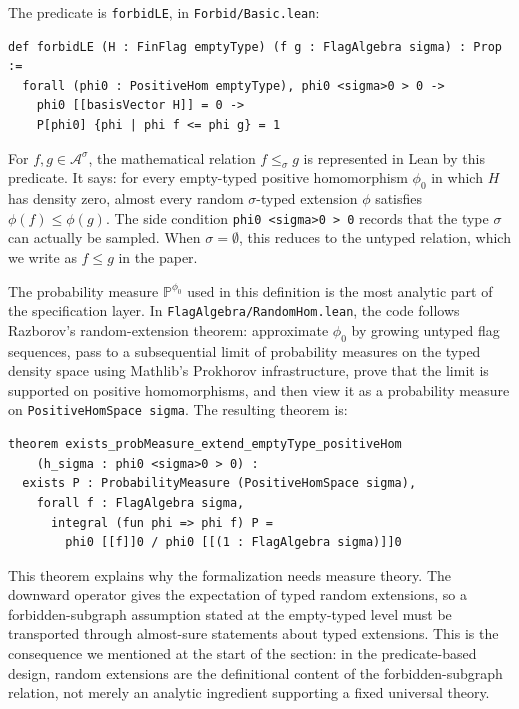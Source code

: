 \documentclass{article}
\newcommand{\lean}[1]{\texttt{#1}}
\begin{document}
The predicate is \lean{forbidLE}, in \lean{Forbid/Basic.lean}:
\begin{lstlisting}
def forbidLE (H : FinFlag emptyType) (f g : FlagAlgebra sigma) : Prop :=
  forall (phi0 : PositiveHom emptyType), phi0 <sigma>0 > 0 ->
    phi0 [[basisVector H]] = 0 ->
    P[phi0] {phi | phi f <= phi g} = 1
\end{lstlisting}
For $f,g\in\mathcal{A}^\sigma$, the mathematical relation
$f \leq_\sigma g$ is represented in Lean by this predicate.  It says:
for every empty-typed positive homomorphism $\phi_0$ in which $H$ has density
zero, almost every random $\sigma$-typed extension $\phi$ satisfies
$\phi(f)\leq\phi(g)$.  The side condition \lean{phi0 <sigma>0 > 0} records
that the type $\sigma$ can actually be sampled.  When $\sigma=\emptyset$, this
reduces to the untyped relation, which we write as $f \leq g$ in the
paper.

The probability measure $\mathbb{P}^{\phi_0}$ used in this definition is
the most analytic part of the specification layer.  In
\lean{FlagAlgebra/RandomHom.lean}, the code follows Razborov's random-extension
theorem: approximate $\phi_0$ by growing untyped flag sequences, pass to a
subsequential limit of probability measures on the typed density space using
Mathlib's Prokhorov infrastructure, prove that the limit is supported on
positive homomorphisms, and then view it as a probability measure on
\lean{PositiveHomSpace sigma}.  The resulting theorem is:
\begin{lstlisting}
theorem exists_probMeasure_extend_emptyType_positiveHom
    (h_sigma : phi0 <sigma>0 > 0) :
  exists P : ProbabilityMeasure (PositiveHomSpace sigma),
    forall f : FlagAlgebra sigma,
      integral (fun phi => phi f) P =
        phi0 [[f]]0 / phi0 [[(1 : FlagAlgebra sigma)]]0
\end{lstlisting}
This theorem explains why the formalization needs measure theory.  The
downward operator gives the expectation of typed random extensions, so a
forbidden-subgraph assumption stated at the empty-typed level must be
transported through almost-sure statements about typed extensions.  This is
the consequence we mentioned at the start of the section: in the
predicate-based design, random extensions are the definitional content of the
forbidden-subgraph relation, not merely an analytic ingredient supporting a
fixed universal theory.
\end{document}
